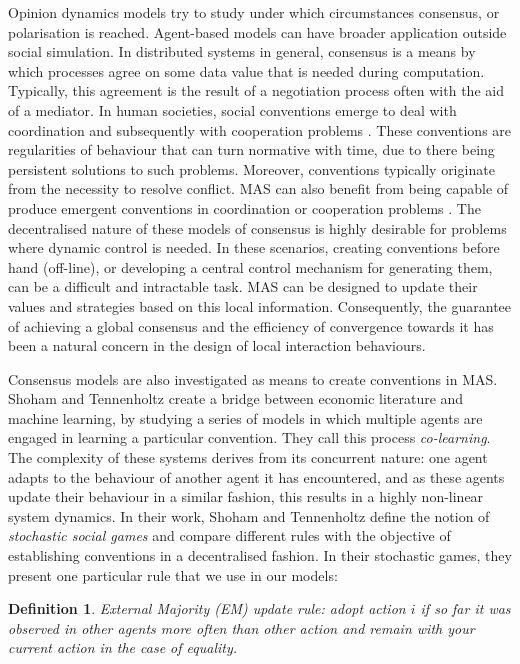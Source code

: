 \documentclass[preprint,number]{elsarticle}
\newtheorem{mydef}{Definition}
\begin{document}
	Opinion dynamics models try to study under which circumstances consensus, or polarisation is reached. Agent-based models can have broader application outside social simulation. In distributed systems in general, consensus is a means by which processes agree on some data value that is needed during computation. Typically, this agreement is the result of a negotiation process often with the aid of a mediator. In human societies, social conventions emerge to deal with coordination and subsequently with cooperation problems \cite{Lewis1969}. These conventions are regularities of behaviour that can turn normative with time, due to there being persistent solutions to such problems. Moreover, conventions typically originate from the necessity to resolve conflict. MAS can also benefit from being capable of produce emergent conventions in coordination or cooperation problems \cite{Delgado2002}. The decentralised nature of these models of consensus is highly desirable for problems where dynamic control is needed. In these scenarios, creating conventions before hand (off-line), or developing a central control mechanism for generating them, can be a difficult and intractable task. MAS can be designed to update their values and strategies based on this local information. Consequently, the guarantee of achieving a global consensus and the efficiency of convergence towards it has been a natural concern in the design of local interaction behaviours. 
	
	Consensus models are also investigated as means to create conventions in MAS. Shoham and Tennenholtz \cite{Shoham1994} create a bridge between economic literature and machine learning, by studying a series of models in which multiple agents are engaged in learning a particular convention. They call this process \textit{co-learning}. The complexity of these systems derives from its concurrent nature: one agent adapts to the behaviour of another agent it has encountered, and as these agents update their behaviour in a similar fashion, this results in a highly non-linear system dynamics. In their work, Shoham and Tennenholtz define the notion of \textit{stochastic social games} and compare different rules with the objective of establishing conventions in a decentralised fashion. In their stochastic games, they present one particular rule that we use in our models: 
	
	\begin{mydef}
		\label{def:external-majority}
		\textit{External Majority (EM)} update rule: adopt action $i$ if so far it was observed in other agents more often than other action and remain with your current action in the case of equality. 
	\end{mydef}
	
\end{document}
